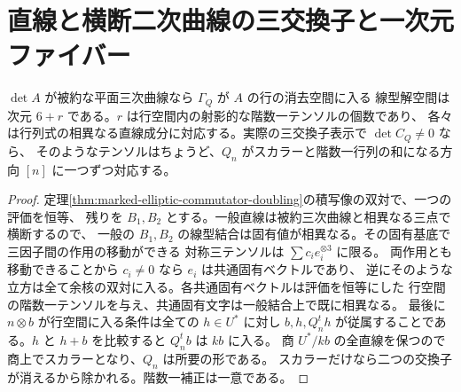 \section{直線と横断二次曲線の三交換子と一次元ファイバー}
\label{sec:marked-transverse-conic-commutators}
\begin{lemma}\label{lem:marked-squarefree-symmetrizer}
$\det A$ が被約な平面三次曲線なら $\Gamma_Q$ が $A$ の行の消去空間に入る
線型解空間は次元 $6+r$ である。$r$ は行空間内の射影的な階数一テンソルの個数であり、
各々は行列式の相異なる直線成分に対応する。実際の三交換子表示で $\det C_Q\ne0$ なら、
そのようなテンソルはちょうど、$Q_n$ がスカラーと階数一行列の和になる方向 $[n]$ に一つずつ対応する。
\end{lemma}
\begin{proof}
定理\ref{thm:marked-elliptic-commutator-doubling}の積写像の双対で、一つの評価を恒等、
残りを $B_1,B_2$ とする。一般直線は被約三次曲線と相異なる三点で横断するので、
一般の $B_1,B_2$ の線型結合は固有値が相異なる。その固有基底で三因子間の作用の移動ができる
対称三テンソルは $\sum c_i e_i^{\otimes3}$ に限る。
両作用とも移動できることから $c_i\ne0$ なら $e_i$ は共通固有ベクトルであり、
逆にそのような立方は全て余核の双対に入る。各共通固有ベクトルは評価を恒等にした
行空間の階数一テンソルを与え、共通固有文字は一般結合上で既に相異なる。
最後に $n\otimes b$ が行空間に入る条件は全ての $h\in U^*$ に対し
$b,h,Q_n^t h$ が従属することである。$h$ と $h+b$ を比較すると $Q_n^t b$ は $kb$ に入る。
商 $U^*/kb$ の全直線を保つので商上でスカラーとなり、$Q_n$ は所要の形である。
スカラーだけなら二つの交換子が消えるから除かれる。階数一補正は一意である。
\end{proof}

